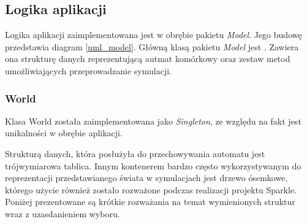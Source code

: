 \subsection {Logika aplikacji}
Logika aplikacji zaimplementowana jest w obrębie pakietu \textit{Model}.
Jego budowę przedstawia diagram \ref{uml_model}.
Główną klasą pakietu \textit{Model} jest . Zawiera ona strukturę danych reprezentującą autmat komórkowy oraz
zestaw metod umożliwiających przeprowadzanie symulacji.
\subsubsection{World}
Klasa World została zaimplementowana jako \textit{Singleton}, ze względu na fakt
jest unikalności w obrębie aplikacji. 

Strukturą danych, która posłużyła do przechowywania automatu jest trójwymiarowa tablica. Innym kontenerem bardzo często wykorzystywanym do reprezentacji przedstawianego świata w symulacjach jest drzewo ósemkowe, którego użycie również zostało rozważone podczas realizacji projektu Sparkle. Poniżej prezentowane są krótkie rozważania na temat wymienionych struktur wraz z uzasdanieniem wyboru. 

